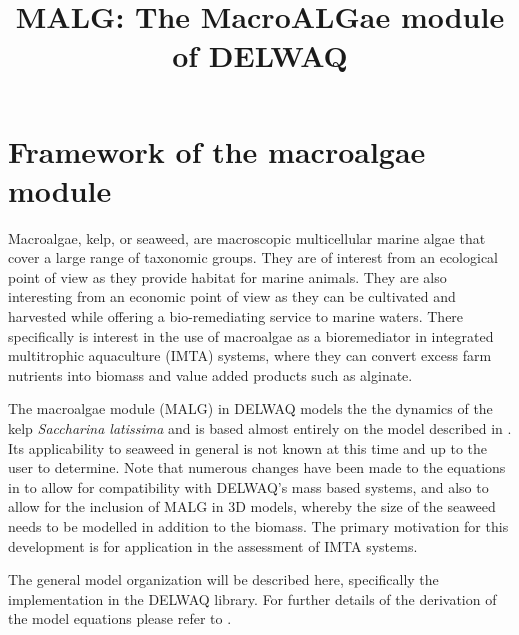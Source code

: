 \documentclass{deltares_manual}
\begin{document}
\title{MALG: The MacroALGae module of DELWAQ}
\section{Framework of the macroalgae module}

Macroalgae, kelp, or seaweed, are macroscopic multicellular marine algae that cover a large range of taxonomic groups. They are of interest from an ecological point of view as they provide habitat for marine animals. They are also interesting from an economic point of view as they can be cultivated and harvested while offering a bio-remediating service to marine waters. There specifically is interest in the use of macroalgae as a bioremediator in integrated multitrophic aquaculture (IMTA) systems, where they can convert excess farm nutrients into biomass and value added products such as alginate. 

The macroalgae module (MALG) in DELWAQ models the the dynamics of the kelp \textit{Saccharina latissima} and is based almost entirely on the model described in \cite{broch2012}. Its applicability to seaweed in general is not known at this time and up to the user to determine. Note that numerous changes have been made to the equations in \cite{broch2012} to allow for compatibility with DELWAQ's mass based systems, and also to allow for the inclusion of MALG in 3D models, whereby the size of the seaweed needs to be modelled in addition to the biomass. The primary motivation for this development is for application in the assessment of IMTA systems. 

The general model organization will be described here, specifically the implementation in the DELWAQ library. For further details of the derivation of the model equations please refer to \cite{broch2012}.
\end{document}
